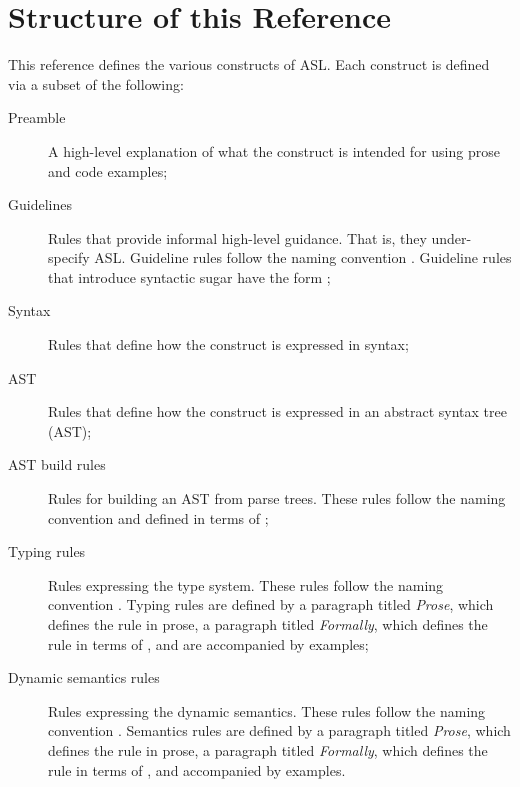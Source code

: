 \section{Structure of this Reference}
This reference defines the various constructs of ASL.
Each construct is defined via a subset of the following:
\begin{description}
    \item[Preamble] A high-level explanation of what the construct is intended for using
        prose and code examples;
    \item[Guidelines] Rules that provide informal high-level guidance.
        That is, they under-specify ASL.
        Guideline rules follow the naming convention .
        Guideline rules that introduce syntactic sugar have the form ;
    \item[Syntax] Rules that define how the construct is expressed in syntax;
    \item[AST] Rules that define how the construct is expressed in an abstract syntax tree (AST);
    \item[AST build rules] Rules for building an AST from parse trees.
        These rules follow the naming convention 
        and defined in terms of \inferencerules;
    \item[Typing rules] Rules expressing the type system.
        These rules follow the naming convention .
        Typing rules are defined by a paragraph titled \emph{Prose},
        which defines the rule in prose,
        a paragraph titled \emph{Formally}, which defines the rule in terms of \inferencerules,
        and are accompanied by examples;
    \item[Dynamic semantics rules] Rules expressing the dynamic semantics.
        These rules follow the naming convention .
        Semantics rules are defined by a paragraph titled \emph{Prose},
        which defines the rule in prose,
        a paragraph titled \emph{Formally}, which defines the rule in terms of \inferencerules,
        and accompanied by examples.
\end{description}

